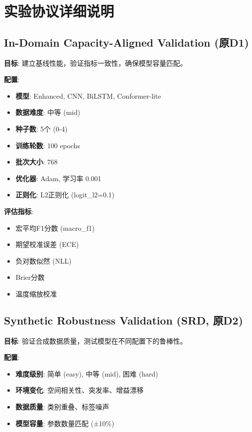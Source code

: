 \section{实验协议详细说明}

\subsection{In-Domain Capacity-Aligned Validation (原D1)}
\textbf{目标}: 建立基线性能，验证指标一致性，确保模型容量匹配。

\textbf{配置}:
\begin{itemize}
    \item \textbf{模型}: Enhanced, CNN, BiLSTM, Conformer-lite
    \item \textbf{数据难度}: 中等 (mid)
    \item \textbf{种子数}: 5个 (0-4)
    \item \textbf{训练轮数}: 100 epochs
    \item \textbf{批次大小}: 768
    \item \textbf{优化器}: Adam, 学习率 0.001
    \item \textbf{正则化}: L2正则化 (logit\_l2=0.1)
\end{itemize}

\textbf{评估指标}:
\begin{itemize}
    \item 宏平均F1分数 (macro\_f1)
    \item 期望校准误差 (ECE)
    \item 负对数似然 (NLL)
    \item Brier分数
    \item 温度缩放校准
\end{itemize}

\subsection{Synthetic Robustness Validation (SRD, 原D2)}
\textbf{目标}: 验证合成数据质量，测试模型在不同配置下的鲁棒性。

\textbf{配置}:
\begin{itemize}
    \item \textbf{难度级别}: 简单 (easy), 中等 (mid), 困难 (hard)
    \item \textbf{环境变化}: 空间相关性、突发率、增益漂移
    \item \textbf{数据质量}: 类别重叠、标签噪声
    \item \textbf{模型容量}: 参数数量匹配 (±10\%)
\end{itemize}

